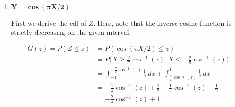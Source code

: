 \documentclass[10pt, oneside]{article}
\begin{document}
\begin{enumerate}[label=5.\arabic*]
\begin{enumerate}
	\begin{proof}
	First observe that $\sin( \sin^{-1} (x)) = x$. Then $\frac{d}{dx} \sin( \sin^{-1} (x)) = \frac{d}{dx} x$, and it immediately follows that $\cos (\sin^{-1} (x)) \frac{d}{dx} \sin^{-1} (x) = 1 \implies \frac{d}{dx} \sin^{-1} (x) = \frac{1}{\cos( \sin^{-1} (x))}$. Now, using the fact that $\sin^2 y + \cos^2 y = 1$, and from that deriving $\cos y = \sqrt{1 - \sin^2 y}$, we can write $\cos (\sin^{-1} (x)) = \sqrt{1 - \sin^2 (\sin^{-1} (x))} = \sqrt{1 - x^2}$ by virtue of inverses. Therefore, $\frac{d}{dx} \sin^{-1} (x) = \frac{1}{\sqrt{1 - x^2}}$.  
	\end{proof}
	
	Proceeding, we derive:
	
	\[ G'(y) = g(y) = \frac{d}{dy} \Big( \frac{1}{\pi} \sin^{-1} (y) + \frac{1}{2} \Big) = \boxed{\frac{1}{\pi} \frac{1}{\sqrt{1 - y^2}} } \]
	
	For $Y = \sin(\pi X / 2)$ on $-1 < X < 1$, it follows that $-1 < Y < 1$. Then $g(y) \geq 0$ for $-1 < Y < 1$. Additionally, $\int^1_{-1} \frac{1}{\pi} \frac{1}{\sqrt{1 - y^2}} dy = \boxed{1}$, confirming $g(y)$ is a pdf.
	
	Alternatively, because $Y = \sin(\pi X / 2), -1 < X < 1$ is monotonic, we may apply Theorem 5.1. Finding $X = (2 / \pi) \sin^{-1} (y)$ as before, it follows that $\frac{dx}{dy} = |\frac{dx}{dy}| = \frac{2}{\pi \sqrt{1 - y^2}}$, and $g(y) = \frac{1}{2} \cdot \frac{2}{\pi \sqrt{1 - y^2}} = \frac{1}{\pi \sqrt{1-y^2}}$, as expected.
	
	\item  \begin{tcolorbox}[
	  colback=Cerulean!5!white,
	  colframe=Cerulean!75!black]
	\textbf{$\bm{Y = \cos (\pi X / 2)}$}
	\end{tcolorbox}
	
	First we derive the cdf of $Z$. Here, note that the inverse cosine function is strictly decreasing on the given interval:
	
	\begin{align*}
	G(z) = P(Z \leq z) &= P(\cos (\pi X / 2) \leq z) \\
	&= P \Big(X \geq \frac{2}{\pi} \cos^{-1} (z), X \leq -\frac{2}{\pi} \cos^{-1} (z) \Big) \\
	&= \int^{-\frac{2}{\pi} \cos^{-1} (z)}_{-1} \frac{1}{2} \ dx + \int^1_{\frac{2}{\pi} \cos^{-1} (z)} \frac{1}{2} \ dx \\
	&= -\frac{1}{\pi} \cos^{-1} (z) + \frac{1}{2} - \frac{1}{\pi} \cos^{-1} (z) + \frac{1}{2} \\
	&= -\frac{2}{\pi} \cos^{-1} (z) + 1
	\end{align*}
	

\end{enumerate}
\end{enumerate}
\end{document}
